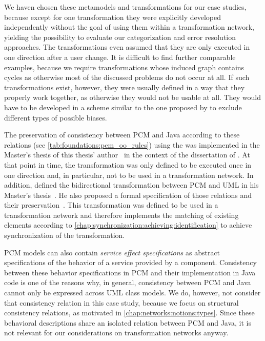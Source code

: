 We haven chosen these metamodels and transformations for our case studies, because except for one transformation they were explicitly developed independently without the goal of using them within a transformation network, yielding the possibility to evaluate our categorization and error resolution approaches.
The transformations even assumed that they are only executed in one direction after a user change.
It is difficult to find further comparable examples, because we require transformations whose induced graph contains cycles as otherwise most of the discussed problems do not occur at all.
If such transformations exist, however, they were usually defined in a way that they properly work together, as otherwise they would not be usable at all.
They would have to be developed in a scheme similar to the one proposed by \textcite{kramer2016c} to exclude different types of possible biases.

The preservation of consistency between \gls{PCM} and Java according to these relations (see \autoref{tab:foundations:pcm_oo_rules}) using the \reactionslanguage was implemented in the Master's thesis of this thesis' author~\cite{klare2016b} in the context of the dissertation of \textcite{langhammer2017a}.
At that point in time, the transformation was only defined to be executed once in one direction and, in particular, not to be used in a transformation network.
In addition, \citeauthor{syma2018ma} defined the bidirectional transformation between \gls{PCM} and \gls{UML} in his Master's thesis~\cite{syma2018ma}.
He also proposed a formal specification of those relations and their preservation~\cite[Section 5]{syma2018ma}.
This transformation was defined to be used in a transformation network and therefore implements the matching of existing elements according to \autoref{chap:synchronization:achieving:identification} to achieve synchronization of the transformation.

\gls{PCM} models can also contain \emph{service effect specifications} as abstract specifications of the behavior of a service provided by a component.
Consistency between these behavior specifications in \gls{PCM} and their implementation in Java code is one of the reasons why, in general, consistency between \gls{PCM} and Java cannot only be expressed across \gls{UML} class models.
We do, however, not consider that consistency relation in this case study, because we focus on structural consistency relations, as motivated in \autoref{chap:networks:notions:types}.
Since these behavioral descriptions share an isolated relation between \gls{PCM} and Java, it is not relevant for our considerations on transformation networks anyway.

